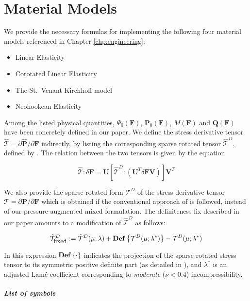 
\chapter{Material Models}
\label{apx:materialmodels}

\noindent We provide the necessary formulas for implementing the following four material
models referenced in Chapter \ref{chp:engineering}:
\begin{itemize}
\item Linear Elasticity
\item Corotated Linear Elasticity
\item The St.\ Venant-Kirchhoff model
\item Neohookean Elasticity
\end{itemize}

Among the listed physical quantities, $\Psi_0(\mathbf{F})$,
$\mathbf{P}_0(\mathbf{F})$, $M(\mathbf{F})$ and $\mathbf{Q}(\mathbf{F})$ have
been concretely defined in our paper. We define the stress derivative tensor
$\hat{\mathcal{T}}=\partial\hat{\mathbf{P}}/\partial\mathbf{F}$ indirectly, by listing the corresponding sparse rotated tensor
$\hat{\mathcal{T}}^D$, defined by \citet{TeranSIF:2005}. The relation between the
two tensors is given by the equation

$$
\hat{\mathcal{T}}:\delta\mathbf{F}=
\mathbf{U}
\left[
\hat{\mathcal{T}}^D:
\left(
\mathbf{U}^T\delta\mathbf{FV}
\right)
\right]
\mathbf{V}^T
$$

We also provide the sparse rotated form $\mathcal{T}^D$ of the stress derivative
tensor $\mathcal{T}=\partial\mathbf{P}/\partial\mathbf{F}$ which is obtained if
the conventional approach of \citet{TeranSIF:2005} is followed, instead of our
pressure-augmented mixed formulation. The definiteness fix described in our
paper amounts to a modification of $\hat{\mathcal{T}}^D$ as follows:

$$
\hat{\mathcal{T}}^D_{\mbox{\small fixed}}:=\hat{\mathcal{T}}^D(\mu;\lambda)+\mbox{\textbf{Def}}\left\{\mathcal{T}^D(\mu;\lambda^\ast)\right\}-\mathcal{T}^D(\mu;\lambda^\ast)
$$

In this expression $\mbox{\textbf{Def}}\left\{\cdot\right\}$ indicates the
projection of the sparse rotated stress tensor to its symmetric positive
definite part (as detailed in \citet{TeranSIF:2005}), and $\lambda^\ast$ is an
adjusted Lam\'{e} coefficient corresponding to \emph{moderate} ($\nu<0.4$) incompressibility.

\paragraph{List of symbols}

